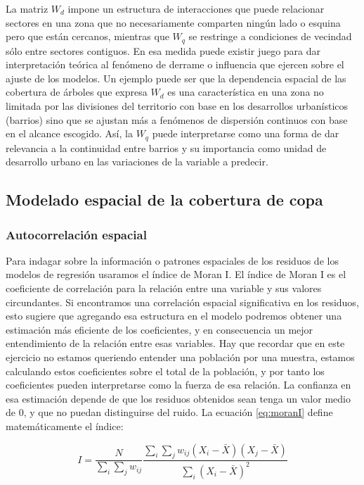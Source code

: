 \documentclass[12pt,]{book}
\begin{document}
La matriz \(W_d\) impone un estructura de interacciones que puede
relacionar sectores en una zona que no necesariamente comparten ningún
lado o esquina pero que están cercanos, mientras que \(W_q\) se
restringe a condiciones de vecindad sólo entre sectores contiguos. En
esa medida puede existir juego para dar interpretación teórica al
fenómeno de derrame o influencia que ejercen sobre el ajuste de los
modelos. Un ejemplo puede ser que la dependencia espacial de las
cobertura de árboles que expresa \(W_d\) es una característica en una
zona no limitada por las divisiones del territorio con base en los
desarrollos urbanísticos (barrios) sino que se ajustan más a fenómenos
de dispersión continuos con base en el alcance escogido. Así, la \(W_q\)
puede interpretarse como una forma de dar relevancia a la continuidad
entre barrios y su importancia como unidad de desarrollo urbano en las
variaciones de la variable a predecir.

\subsection{Modelado espacial de la cobertura de
copa}\label{modelado-espacial-de-la-cobertura-de-copa}

\subsubsection{Autocorrelación espacial}\label{autocorrelacion-espacial}

Para indagar sobre la información o patrones espaciales de los residuos
de los modelos de regresión usaramos el índice de Moran I. El índice de
Moran I es el coeficiente de correlación para la relación entre una
variable y sus valores circundantes. Si encontramos una correlación
espacial significativa en los residuos, esto sugiere que agregando esa
estructura en el modelo podremos obtener una estimación más eficiente de
los coeficientes, y en consecuencia un mejor entendimiento de la
relación entre esas variables. Hay que recordar que en este ejercicio no
estamos queriendo entender una población por una muestra, estamos
calculando estos coeficientes sobre el total de la población, y por
tanto los coeficientes pueden interpretarse como la fuerza de esa
relación. La confianza en esa estimación depende de que los residuos
obtenidos sean tenga un valor medio de 0, y que no puedan distinguirse
del ruido. La ecuación \eqref{eq:moranI} define matemáticamente el índice:

\begin{equation}
 I=\frac {N}{\sum _{i}\sum _{j}w_{ij}} \frac {\sum _{i}\sum _{j}w_{ij}(X_{i}-{\bar {X}})(X_{j}-{\bar {X}})}{\sum _{i}(X_{i}- \bar{X})^{2}}
\label{eq:moranI}
\end{equation}
\end{document}
